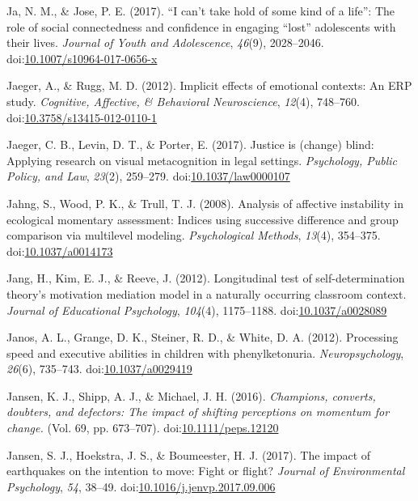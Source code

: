 \documentclass[english,man]{apa6}
\theoremstyle{definition}
\theoremstyle{definition}
\theoremstyle{definition}
\theoremstyle{remark}
\begin{document}
\hypertarget{ref-Ja2017}{}
Ja, N. M., \& Jose, P. E. (2017). ``I can't take hold of some kind of a
life'': The role of social connectedness and confidence in engaging
``lost'' adolescents with their lives. \emph{Journal of Youth and
Adolescence}, \emph{46}(9), 2028--2046.
doi:\href{https://doi.org/10.1007/s10964-017-0656-x}{10.1007/s10964-017-0656-x}

\hypertarget{ref-Jaeger2012}{}
Jaeger, A., \& Rugg, M. D. (2012). Implicit effects of emotional
contexts: An ERP study. \emph{Cognitive, Affective, \& Behavioral
Neuroscience}, \emph{12}(4), 748--760.
doi:\href{https://doi.org/10.3758/s13415-012-0110-1}{10.3758/s13415-012-0110-1}

\hypertarget{ref-Jaeger2017}{}
Jaeger, C. B., Levin, D. T., \& Porter, E. (2017). Justice is (change)
blind: Applying research on visual metacognition in legal settings.
\emph{Psychology, Public Policy, and Law}, \emph{23}(2), 259--279.
doi:\href{https://doi.org/10.1037/law0000107}{10.1037/law0000107}

\hypertarget{ref-Jahng2008}{}
Jahng, S., Wood, P. K., \& Trull, T. J. (2008). Analysis of affective
instability in ecological momentary assessment: Indices using successive
difference and group comparison via multilevel modeling.
\emph{Psychological Methods}, \emph{13}(4), 354--375.
doi:\href{https://doi.org/10.1037/a0014173}{10.1037/a0014173}

\hypertarget{ref-Jang2012}{}
Jang, H., Kim, E. J., \& Reeve, J. (2012). Longitudinal test of
self-determination theory's motivation mediation model in a naturally
occurring classroom context. \emph{Journal of Educational Psychology},
\emph{104}(4), 1175--1188.
doi:\href{https://doi.org/10.1037/a0028089}{10.1037/a0028089}

\hypertarget{ref-Janos2012}{}
Janos, A. L., Grange, D. K., Steiner, R. D., \& White, D. A. (2012).
Processing speed and executive abilities in children with
phenylketonuria. \emph{Neuropsychology}, \emph{26}(6), 735--743.
doi:\href{https://doi.org/10.1037/a0029419}{10.1037/a0029419}

\hypertarget{ref-Jansen2016}{}
Jansen, K. J., Shipp, A. J., \& Michael, J. H. (2016). \emph{Champions,
converts, doubters, and defectors: The impact of shifting perceptions on
momentum for change.} (Vol. 69, pp. 673--707).
doi:\href{https://doi.org/10.1111/peps.12120}{10.1111/peps.12120}

\hypertarget{ref-Jansen2017}{}
Jansen, S. J., Hoekstra, J. S., \& Boumeester, H. J. (2017). The impact
of earthquakes on the intention to move: Fight or flight? \emph{Journal
of Environmental Psychology}, \emph{54}, 38--49.
doi:\href{https://doi.org/10.1016/j.jenvp.2017.09.006}{10.1016/j.jenvp.2017.09.006}
\end{document}
